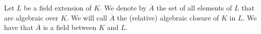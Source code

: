 \documentclass[12pt]{article}
\begin{document}
 Let $L$ be a field extension of $K$. We denote by $\overline{A}$ the set of all elements of $L$ that are algebraic over $K$. We will call $\overline{A}$ the (relative) algebraic closure of $K$ in $L$. We have that $\overline{A}$ is a field between $K$ and $L$. 
\end{document}
